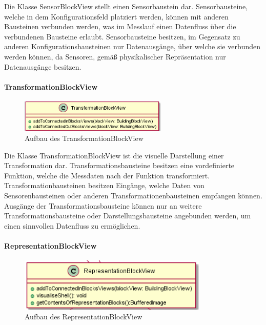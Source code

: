 \documentclass[parskip=full]{scrartcl}
\begin{document}
Die Klasse SensorBlockView stellt einen Sensorbaustein dar. 
Sensorbausteine, welche in dem Konfigurationsfeld platziert werden, können mit anderen Bausteinen verbunden werden, was im Messlauf einen Datenfluss über die verbundenen Bausteine erlaubt. Sensorbausteine besitzen, im Gegensatz zu anderen Konfigurationsbausteinen nur Datenausgänge, über welche sie verbunden werden können, da Sensoren, gemäß physikalischer 
Repräsentation nur Datenausgänge besitzen.

\paragraph{TransformationBlockView}

\begin{figure}[htbp]
	\begin{center}
		\includegraphics[width = 7cm]{Grafiken/View/TransformationBlockView.png}
		\caption{Aufbau des TransformationBlockView}
		\label{Entwurf_Grob}
	\end{center}
\end{figure}

Die Klasse TransformationBlockView ist die visuelle Darstellung einer Transformation dar. Transformationsbausteine besitzen eine vordefinierte Funktion, welche die Messdaten nach der Funktion transformiert. Transformationbausteinen besitzen Eingänge, welche Daten von Sensorenbausteinen oder anderen Transformationenbausteinen empfangen können. Ausgänge der Transformationsbausteine können nur an weitere Transformationsbausteine oder Darstellungsbausteine angebunden werden, um einen sinnvollen Datenfluss zu ermöglichen. 

\paragraph{RepresentationBlockView} 

\begin{figure}[htbp]
	\begin{center}
		\includegraphics[width = 9cm]{Grafiken/View/RepresentationBlockView.png}
		\caption{Aufbau des RepresentationBlockView}
		\label{Entwurf_Grob}
	\end{center}
\end{figure}
\end{document}
